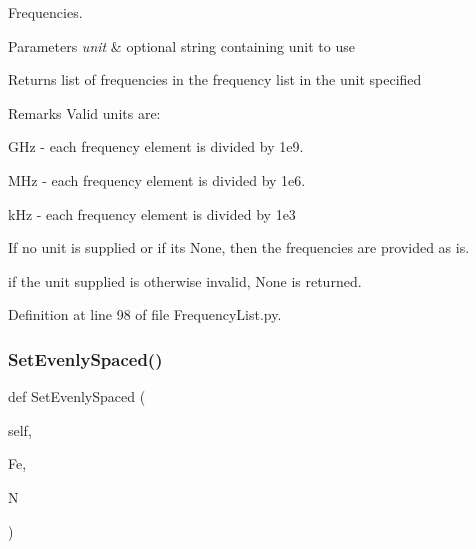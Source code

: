 Frequencies. 


\begin{DoxyParams}{Parameters}
{\em unit} & optional string containing unit to use \\
\hline
\end{DoxyParams}
\begin{DoxyReturn}{Returns}
list of frequencies in the frequency list in the unit specified 
\end{DoxyReturn}
\begin{DoxyRemark}{Remarks}
Valid units are\+:
\begin{DoxyItemize}
\item G\+Hz -\/ each frequency element is divided by 1e9.
\item M\+Hz -\/ each frequency element is divided by 1e6.
\item k\+Hz -\/ each frequency element is divided by 1e3
\end{DoxyItemize}
\end{DoxyRemark}
If no unit is supplied or if it\textquotesingle{}s None, then the frequencies are provided as is.

if the unit supplied is otherwise invalid, None is returned. 

Definition at line 98 of file Frequency\+List.\+py.

\mbox{\label{classSignalIntegrity_1_1FrequencyDomain_1_1FrequencyList_1_1FrequencyList_a910c951aef6578c9e467ddef68c94539}} 
\subsubsection{\texorpdfstring{Set\+Evenly\+Spaced()}{SetEvenlySpaced()}}
{\footnotesize\ttfamily def Set\+Evenly\+Spaced (\begin{DoxyParamCaption}\item[{}]{self,  }\item[{}]{Fe,  }\item[{}]{N }\end{DoxyParamCaption})}



